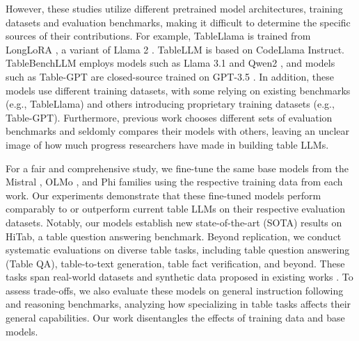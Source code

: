 \documentclass[11pt]{article}
\begin{document}
However, these studies utilize different pretrained model architectures, training datasets and evaluation benchmarks, making it difficult to determine the specific sources of their contributions.
For example, TableLlama \citep{zhang-etal-2024-tablellama} is trained from LongLoRA \cite{longlora}, a variant of Llama 2 \citep{touvron2023llama}. 
TableLLM \cite{zhang2024tablellm} is based on CodeLlama Instruct. 
TableBenchLLM \cite{wu2024tablebenchcomprehensivecomplexbenchmark} employs models such as Llama 3.1 \cite{dubey2024llama} and Qwen2 \cite{yang2024qwen2}, and models such as Table-GPT \citep{li2023table} are closed-source trained on GPT-3.5 \cite{ouyang2022training}.
In addition, these models use different training datasets, with some relying on existing benchmarks (e.g., TableLlama) and others introducing proprietary training datasets (e.g., Table-GPT).
Furthermore, previous work chooses different sets of evaluation benchmarks and seldomly compares their models with others, leaving an unclear image of how much progress researchers have made in building table LLMs.

For a fair and comprehensive study, we fine-tune the same base models from the Mistral \citep{jiang2023mistral}, OLMo \citep{groeneveld2024olmo}, and Phi \citep{abdin2024phi} families using the respective training data from each work.
Our experiments demonstrate that these fine-tuned models perform comparably to or outperform current table LLMs on their respective evaluation datasets. 
Notably, our models establish new state-of-the-art (SOTA) results on HiTab, a table question answering benchmark.
Beyond replication, we conduct systematic evaluations on diverse table tasks, including table question answering (Table QA), table-to-text generation, table fact verification, and beyond.
These tasks span real-world datasets \citep{nan-etal-2022-fetaqa, cheng-etal-2022-hitab} and synthetic data proposed in existing works \citep{li2023table, wu2024tablebenchcomprehensivecomplexbenchmark}.
To assess trade-offs, we also evaluate these models on general instruction following and reasoning benchmarks, analyzing how specializing in table tasks affects their general capabilities.
Our work disentangles the effects of training data and base models.
\end{document}
